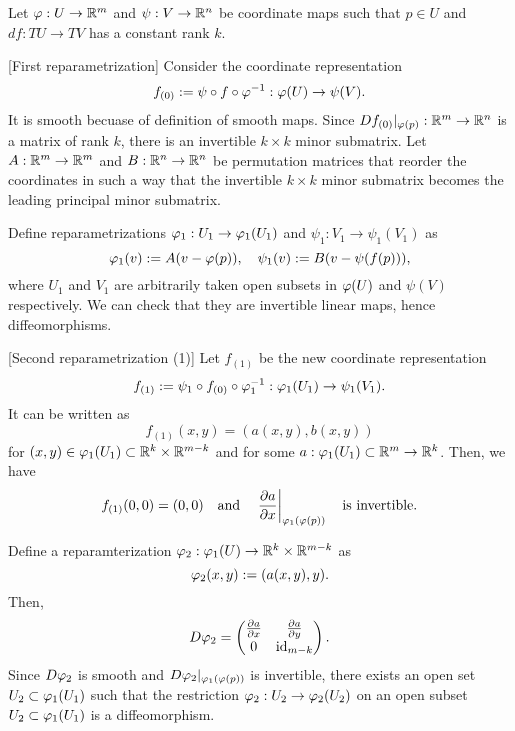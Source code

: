 \documentclass{../note}
\begin{document}
\begin{pf}
Let $\varphi:U\to\mathbb{R}^m$ and $\psi:V\to\mathbb{R}^n$ be coordinate maps such that $p\in U$ and $df:TU\to TV$ has a constant rank $k$.

[First reparametrization]
Consider the coordinate representation
\[f_{(0)}:=\psi\circ f\circ\varphi^{-1}:\varphi(U)\to\psi(V).\]
It is smooth becuase of definition of smooth maps.
Since $Df_{(0)}|_{\varphi(p)}:\mathbb{R}^m\to\mathbb{R}^n$ is a matrix of rank $k$, there is an invertible $k\times k$ minor submatrix.
Let $A:\mathbb{R}^m\to\mathbb{R}^m$ and $B:\mathbb{R}^n\to\mathbb{R}^n$ be permutation matrices that reorder the coordinates in such a way that the invertible $k\times k$ minor submatrix becomes the leading principal minor submatrix.

Define reparametrizations $\varphi_1:U_1\to\varphi_1(U_1)$ and $\psi_1:V_1\to\psi_1(V_1)$ as
\[\varphi_1(v):=A(v-\varphi(p)),\quad\psi_1(v):=B(v-\psi(f(p))),\]
where $U_1$ and $V_1$ are arbitrarily taken open subsets in $\varphi(U)$ and $\psi(V)$ respectively.
We can check that they are invertible linear maps, hence diffeomorphisms.

[Second reparametrization (1)]
Let $f_{(1)}$ be the new coordinate representation
\[f_{(1)}:=\psi_1\circ f_{(0)}\circ\varphi_1^{-1}:\varphi_1(U_1)\to\psi_1(V_1).\]
It can be written as
\[f_{(1)}(x,y)=(a(x,y),b(x,y))\]
for $(x,y)\in\varphi_1(U_1)\subset\mathbb{R}^k\times\mathbb{R}^{m-k}$ and for some $a:\varphi_1(U_1)\subset\mathbb{R}^m\to\mathbb{R}^k$.
Then, we have
\[f_{(1)}(0,0)=(0,0)\quad\text{and}\quad\left.\pd{a}{x}\right|_{\f_1(\f(p))}\quad\text{is invertible.}\]

Define a reparamterization $\varphi_2:\varphi_1(U)\to\mathbb{R}^k\times\mathbb{R}^{m-k}$ as
\[\varphi_2(x,y):=(a(x,y),y).\]
Then,
\[D\f_2=\begin{pmatrix}\pd{a}{x}&\pd{a}{y}\\0&\id_{m-k}\end{pmatrix}.\]
Since $D\varphi_2$ is smooth and $D\varphi_2|_{\varphi_1(\varphi(p))}$ is invertible, there exists an open set $U_2\subset\varphi_1(U_1)$ such that the restriction $\varphi_2:U_2\to\varphi_2(U_2)$ on an open subset $U_2\subset\varphi_1(U_1)$ is a diffeomorphism.


\end{pf}
\end{document}
